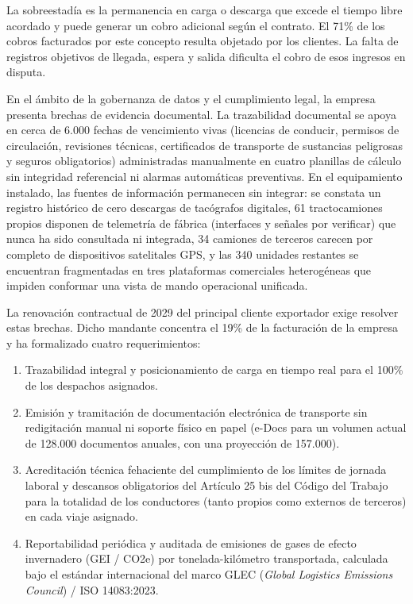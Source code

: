 La sobreestadía es la permanencia en carga o descarga que excede el tiempo libre acordado y puede generar un cobro adicional según el contrato. El 71\% de los cobros facturados por este concepto resulta objetado por los clientes. La falta de registros objetivos de llegada, espera y salida dificulta el cobro de esos ingresos en disputa.

En el ámbito de la gobernanza de datos y el cumplimiento legal, la empresa presenta brechas de evidencia documental. La trazabilidad documental se apoya en cerca de 6.000 fechas de vencimiento vivas (licencias de conducir, permisos de circulación, revisiones técnicas, certificados de transporte de sustancias peligrosas y seguros obligatorios) administradas manualmente en cuatro planillas de cálculo sin integridad referencial ni alarmas automáticas preventivas. En el equipamiento instalado, las fuentes de información permanecen sin integrar: se constata un registro histórico de cero descargas de tacógrafos digitales, 61 tractocamiones propios disponen de telemetría de fábrica (interfaces y señales por verificar) que nunca ha sido consultada ni integrada, 34 camiones de terceros carecen por completo de dispositivos satelitales GPS, y las 340 unidades restantes se encuentran fragmentadas en tres plataformas comerciales heterogéneas que impiden conformar una vista de mando operacional unificada.

La renovación contractual de 2029 del principal cliente exportador exige resolver estas brechas. Dicho mandante concentra el 19\% de la facturación de la empresa y ha formalizado cuatro requerimientos:
\begin{enumerate}
  \item Trazabilidad integral y posicionamiento de carga en tiempo real para el 100\% de los despachos asignados.
  \item Emisión y tramitación de documentación electrónica de transporte sin redigitación manual ni soporte físico en papel (e-Docs para un volumen actual de 128.000 documentos anuales, con una proyección de 157.000).
  \item Acreditación técnica fehaciente del cumplimiento de los límites de jornada laboral y descansos obligatorios del Artículo 25 bis del Código del Trabajo para la totalidad de los conductores (tanto propios como externos de terceros) en cada viaje asignado.
  \item Reportabilidad periódica y auditada de emisiones de gases de efecto invernadero (GEI / CO2e) por tonelada-kilómetro transportada, calculada bajo el estándar internacional del marco GLEC (\textit{Global Logistics Emissions Council}) / ISO 14083:2023.
\end{enumerate}

